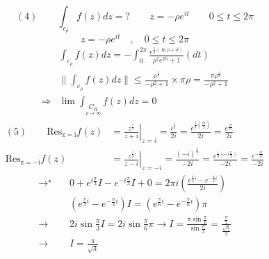 \begin{equation*}
(4) \quad \quad \int_{c_{\rho}} f(z) d z=?  \quad \quad  z=-\rho e^{it} \quad \quad 0\leq t \leq 2\pi	
\end{equation*}
\begin{equation*}
		z = -\rho e^{it} \quad , \quad
	0 \leq t \leq 2\pi
\end{equation*}
\begin{align*}
&\int_{c_{\rho}} f(z) d z=-\int_{0}^{2\pi} \frac{e^{\frac{1}{3}(\ln \rho +it)}}{\rho^{2}e^{2ti}+1}(d t)	 \\
	&\|\int_{c_{\rho}} f(z) d z\|\leq \frac{\rho^{\frac{1}{3}}}{-\rho^{2}+1}\times\pi \rho=\frac{\pi \rho^{\frac{4}{3}}}{-\rho^{2}+1} \\
\Rightarrow & \lim \int_{\underset{\rho \rightarrow \infty}{C_R}}f(z)dz =0
\end{align*}
\begin{equation*}
\begin{split}
(5) \quad\quad \operatorname{Res_{z=i}} f(z)&=\left.\frac{z^{\frac{1}{3}}}{z+i}\right|_{z=i}=\frac{i^{\frac{1}{3}}}{2 i}=\frac{e^{\frac{1}{3} (\frac{i\pi}{2})}}{2 i}=\frac{e^{\frac{i\pi}{6}}}{2 i}	\\
\operatorname{Res_{z= -i}} f(z)&=\left.\frac{z^{\frac{1}{3}}}{z-i}\right|_{z=-i}=\frac{(-i)^{\frac{1}{3}}}{-2 i}=\frac{e^{\frac{1}{3}\left(-i \frac{\pi}{2}\right)}}{-2 i}=\frac{e^{-\frac{i\pi}{6}}}{-2 i}
\end{split}
\end{equation*}
\begin{align*}
	\rightarrow^{\star} \quad & 0+e^{i \frac{\pi}{3}} I-e^{-i \frac{\pi}{3}} I+0=2 \pi i\left(\frac{e^{\frac{\pi}{6} i}-e^{-\frac{\pi}{6}i}}{2 i}\right) \\
		&\left(e^{\frac{\pi}{3} i}-e^{-\frac{n}{3} i}\right) I=\left(e^{\frac{\pi}{6} i}-e^{-\frac{\pi}{6} i}\right) \pi \\
		\rightarrow \quad & 2i \sin \frac{\pi}{3} I=2i \sin \frac{\pi}{6} \pi \rightarrow I=\frac{\pi \sin \frac{\pi}{6}}{\sin \frac{\pi}{3}}=\frac{\frac{\pi}{2}}{\frac{\sqrt{3}}{2}} \\
		\rightarrow \quad &I= \frac{\pi}{\sqrt{3}}
\end{align*}

